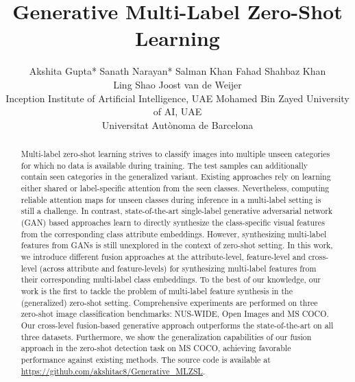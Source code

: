 \documentclass[final]{cvpr}
\begin{document}
\title{\vspace{-0.7em}Generative Multi-Label Zero-Shot Learning}

\author{Akshita Gupta* \quad Sanath Narayan* \quad Salman Khan \quad 
Fahad Shahbaz Khan \\
\quad Ling Shao  \quad Joost van de Weijer \\
Inception Institute of Artificial Intelligence, UAE \quad Mohamed Bin Zayed University of AI, UAE \\
 Universitat Autònoma de Barcelona
}

\maketitle
\begin{abstract}\vspace{-1.0em}
 Multi-label zero-shot learning strives to classify images into multiple unseen categories for which no data is available during training. The test samples can additionally contain seen categories in the generalized variant. Existing approaches rely on learning either shared or label-specific attention from the seen classes. Nevertheless, computing reliable attention maps for unseen classes during inference in a multi-label setting is still a challenge. In contrast, state-of-the-art single-label generative adversarial network (GAN) based approaches learn to directly synthesize the class-specific visual features from the corresponding class attribute embeddings. However, synthesizing multi-label features from GANs is still unexplored in the context of zero-shot setting.
In this work, we introduce different fusion approaches at the attribute-level, feature-level and cross-level (across attribute and feature-levels) for synthesizing multi-label features from their corresponding multi-label class embeddings.
To the best of our knowledge, our work is the first to tackle the problem of multi-label feature synthesis in the (generalized) zero-shot setting. Comprehensive experiments are performed on three zero-shot image classification benchmarks: NUS-WIDE, Open Images and MS COCO. Our cross-level fusion-based generative approach outperforms the state-of-the-art on all three datasets. Furthermore, we show the generalization capabilities of our fusion approach in the zero-shot detection task on MS COCO, achieving favorable performance against existing methods.
The source code is available at 
\url{https://github.com/akshitac8/Generative_MLZSL}.
\end{abstract}
\vspace{-0.4cm}
\end{document}
